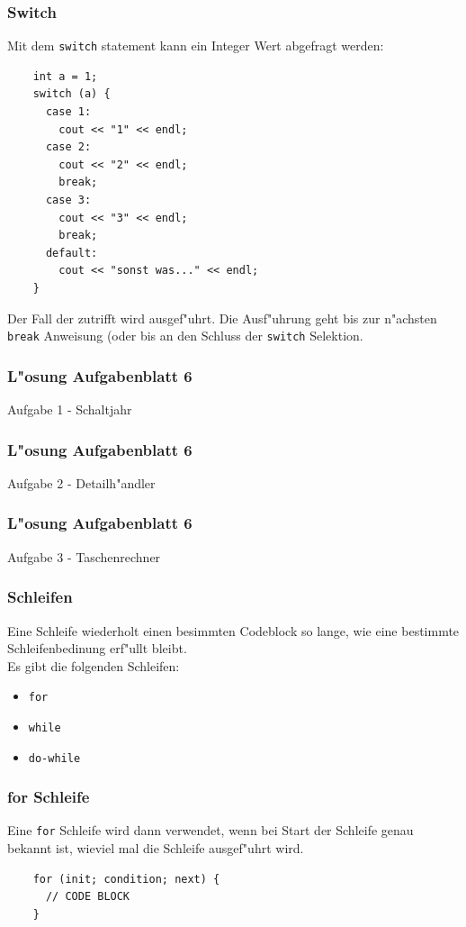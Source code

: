 \documentclass{beamer}
\begin{document}
\begin{frame}[fragile]
	\frametitle{Switch}
	Mit dem \verb|switch| statement kann ein Integer Wert abgefragt werden:
	{\tiny
	\begin{lstlisting}
	int a = 1;
	switch (a) {
	  case 1:
	    cout << "1" << endl;
	  case 2:
	    cout << "2" << endl;
	    break;
	  case 3:
	    cout << "3" << endl;
	    break;
	  default:
	    cout << "sonst was..." << endl;
	}
	\end{lstlisting}
	}
	Der Fall der zutrifft wird ausgef"uhrt. Die Ausf"uhrung geht bis
	zur n"achsten \verb|break| Anweisung (oder bis an den Schluss der
	\verb|switch| Selektion.
\end{frame}

\begin{frame}[fragile]
	\frametitle{L"osung Aufgabenblatt 6}
	Aufgabe 1 - Schaltjahr
	{\tiny
	
	}
\end{frame}

\begin{frame}[fragile]
	\frametitle{L"osung Aufgabenblatt 6}
	Aufgabe 2 - Detailh"andler
	{\tiny
	
	}
\end{frame}

\begin{frame}[fragile]
	\frametitle{L"osung Aufgabenblatt 6}
	Aufgabe 3 - Taschenrechner
	{\tiny
	
	}
\end{frame}

\begin{frame}[fragile]
	\frametitle{Schleifen}
	Eine Schleife wiederholt einen besimmten Codeblock so lange, wie eine
	bestimmte Schleifenbedinung erf"ullt bleibt.\\
	Es gibt die folgenden Schleifen:
	\begin{itemize}
	\item \verb|for|
	\item \verb|while|
	\item \verb|do-while|
	\end{itemize}
\end{frame}

\begin{frame}[fragile]
	\frametitle{for Schleife}
	Eine \verb|for| Schleife wird dann verwendet, wenn bei Start der Schleife
	genau bekannt ist, wieviel mal die Schleife ausgef"uhrt wird.
	\begin{lstlisting}
	for (init; condition; next) {
	  // CODE BLOCK
	}
	\end{lstlisting}
\end{frame}
\end{document}
